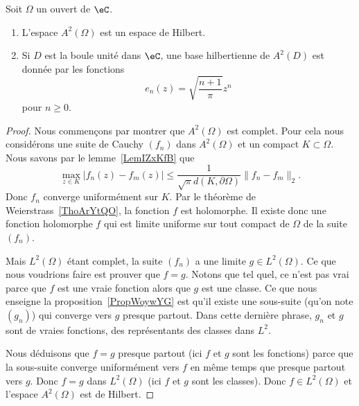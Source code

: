 \begin{theorem}
    Soit \( \Omega\) un ouvert de \( \eC\).
    \begin{enumerate}
        \item
            L'espace \( A^2(\Omega)\) est un espace de Hilbert.
        \item
            Si \( D\) est la boule unité dans \( \eC\), une base hilbertienne de \( A^2(D)\) est donnée par les fonctions
            \begin{equation}
                e_n(z)=\sqrt{\frac{ n+1 }{ \pi }}z^n
            \end{equation}
            pour \( n\geq 0\).
    \end{enumerate}
\end{theorem}

\begin{proof}
    Nous commençons par montrer que \( A^2(\Omega)\) est complet. Pour cela nous considérons une suite de Cauchy \( (f_n)\) dans \( A^2(\Omega)\) et un compact \( K\subset \Omega\). Nous savons par le lemme~\ref{LemIZxKfB} que
    \begin{equation}
        \max_{z\in K}\big| f_n(z)-f_m(z) \big|\leq \frac{1}{ \sqrt{\pi}d(K,\partial\Omega) }\| f_n-f_m \|_2.
    \end{equation}
    Donc \( f_n\) converge uniformément sur \( K\). Par le théorème de Weierstrass~\ref{ThoArYtQO}, la fonction \( f\) est holomorphe. Il existe donc une fonction holomorphe \( f\) qui est limite uniforme sur tout compact de \( \Omega\) de la suite \( (f_n)\).

    Mais \( L^2(\Omega)\) étant complet, la suite \( (f_n)\) a une limite \( g\in L^2(\Omega)\). Ce que nous voudrions faire est prouver que \( f=g\). Notons que tel quel, ce n'est pas vrai parce que \( f\) est une vraie fonction alors que \( g\) est une classe. Ce que nous enseigne la proposition~\ref{PropWoywYG} est qu'il existe une sous-suite (qu'on note \( (g_n)\)) qui converge vers \( g\) presque partout. Dans cette dernière phrase, \( g_n\) et \( g\) sont de vraies fonctions, des représentants des classes dans \( L^2\).

    Nous déduisons que \( f=g\) presque partout (ici \( f\) et \( g\) sont les fonctions) parce que la sous-suite converge uniformément vers \( f\) en même temps que presque partout vers \( g\). Donc \( f=g\) dans \( L^2(\Omega)\) (ici \( f\) et \( g\) sont les classes). Donc \( f\in L^2(\Omega)\) et l'espace \( A^2(\Omega)\) est de Hilbert.


\end{proof}
